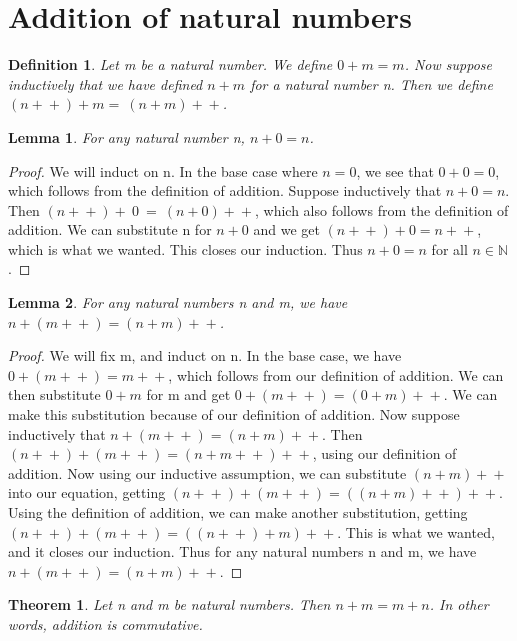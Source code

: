 \documentclass{article}
\newtheorem{definition}{Definition}
\newtheorem{lemma}{Lemma}
\newtheorem{theorem}{Theorem}
\newcommand{\inc}[1]{#1\!+\!+}
\begin{document}
\section{Addition of natural numbers}

\begin{definition}
Let m be a natural number. We define $0 + m = m$. Now suppose inductively that we have defined $n + m$ for a natural number n. Then we define $(\inc{n}) + m = \ \inc{(n+m)}$. 
\end{definition}

\begin{lemma}
For any natural number n, $n + 0 = n$.
\end{lemma}

\begin{proof}
We will induct on n. In the base case where $n = 0$, we see that $0 + 0 = 0$, which follows from the definition of addition. Suppose inductively that $n + 0 = n$. Then $(\inc{n}) + \ 0 \ = \ \inc{(n+0)}$, which also follows from the definition of addition. We can substitute n for $n + 0$ and we get $(\inc{n}) + 0 = \inc{n}$, which is what we wanted. This closes our induction. Thus $n + 0 = n$ for all $n \in \mathbb{N}$.
\end{proof}

\begin{lemma}
For any natural numbers n and m, we have $n + (\inc{m}) = \inc{(n+m)}$.
\end{lemma}

\begin{proof}
We will fix m, and induct on n. In the base case, we have $0 + (\inc{m}) = \inc{m}$, which follows from our definition of addition. We can then substitute $0 + m$ for m and get $0 + (\inc{m}) = \inc{(0+m)}$. We can make this substitution because of our definition of addition. Now suppose inductively that $n + (\inc{m}) = \inc{(n+m)}$. Then $(\inc{n}) + (\inc{m}) = \inc{(n + \inc{m})}$, using our definition of addition. Now using our inductive assumption, we can substitute $\inc{(n+m)}$ into our equation, getting $(\inc{n}) + (\inc{m}) = \inc{( \inc{(n+m)})}$. Using the definition of addition, we can make another substitution, getting $(\inc{n}) + (\inc{m}) = \inc{((\inc{n}) + m)}$. This is what we wanted, and it closes our induction. Thus for any natural numbers n and m, we have $n + (\inc{m}) = \inc{(n+m)}$.
\end{proof}

\begin{theorem}
Let n and m be natural numbers. Then $n + m = m + n$. In other words, addition is commutative.
\end{theorem}
\end{document}

